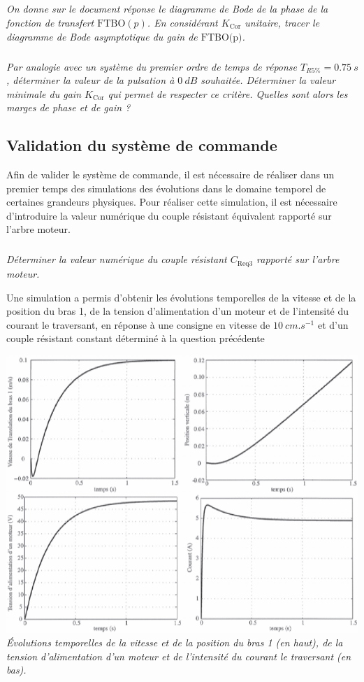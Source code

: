 \documentclass[10pt,fleqn]{article} %
\begin{document}
\subparagraph{}
\textit{On donne sur le document réponse le diagramme de Bode de la phase de la fonction de transfert $\text{FTBO}(p)$. En considérant $K_{\text{Cor}}$ unitaire,  tracer le diagramme  de Bode asymptotique du gain de $\text{FTBO(p)}$.}


\subparagraph{}
\textit{Par analogie  avec  un système  du premier  ordre  de temps  de réponse  $T_{R5\%}   =\SI{0,75}{s}$, déterminer  la valeur de la pulsation  à  $\SI{0}{dB}$ souhaitée.  Déterminer  la valeur minimale  du gain $K_{\text{Cor}}$ qui permet de respecter ce critère. Quelles sont alors les marges de phase et de gain ?}


\subsection{Validation du système de commande}

Afin de valider le système de commande, il est nécessaire de réaliser dans un premier temps des simulations des évolutions dans le domaine temporel de certaines grandeurs physiques. Pour réaliser cette simulation, il est nécessaire d’introduire la valeur numérique du couple résistant équivalent rapporté sur l’arbre moteur.

\subparagraph{}
\textit{Déterminer la valeur numérique du couple résistant $C_{\text{Req3}}$ rapporté sur l’arbre moteur.}
\vspace{.25cm}

Une simulation a permis d’obtenir  les évolutions temporelles  de la vitesse et de la position du bras 1, de la tension d’alimentation d’un moteur et de l’intensité du courant le traversant, en réponse à une consigne en
vitesse de $\SI{10}{cm.s^{-1}}$ et d’un couple résistant constant déterminé à la question précédente

\begin{center}
\includegraphics[width=\linewidth]{images_01/fig_09}
\textit{Évolutions temporelles  de la vitesse et de la position du bras 1 (en haut), de la tension d’alimentation d’un moteur et de l’intensité du courant le traversant (en bas).}
\end{center}
\end{document}
